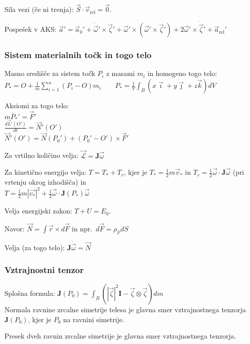 \documentclass[a4paper,10pt]{article}
\theoremstyle{definition}
\newcommand{\vzeta}{\vec{\zeta}}
\newcommand{\dzeta}{\dot{\vzeta}}
\newcommand{\vomega}{\vec{\omega}}
\newcommand{\domega}{\dot{\vomega}}
\newcommand{\va}{\vec{a}}
\newcommand{\Pt}{P_{\ast}}
\begin{document}
Sila vezi (če ni trenja): $\vec{S} \cdot \vec{v}_{\operatorname{rel}} = \vec{0}.$

Pospešek v AKS: $\va' = \va_0' + \domega' \times \vzeta' + \vomega' \times (\vomega' \times \vzeta') + 2 \vomega'\times\dzeta' + \va_{\operatorname{rel}}'$

\subsubsection*{Sistem materialnih točk in togo telo}
Masno središče za sistem točk $P_i$ z masami $m_i$ in homogeno togo telo: \\
$ \displaystyle \Pt = O + \frac1m \sum_{i=1}^n (P_i - O) m_i \qquad \Pt =
\frac1V \int_B (x\vec{\imath} + y\vec{\jmath} + z\vec{k})dV $

Aksiomi za togo telo: \\
$m\ddot{\Pt}' = \vec{F}'$ \\
$\displaystyle \frac{d\vec{L}'(O')}{dt} = \vec{N}'(O')$ \\
$\vec{N}'(O') = \vec{N}(P_0') + (P_0' - O') \times \vec{F}'$

Za vrtilno količino velja: $\vec{\mathscr L} = \mathbf{J} \vec{\omega}$

Za kinetično energijo velja:
$T = T_\ast + T_r$, kjer je $T_\ast = \frac12 m\vec{v}_\ast$ in $T_r = \frac12
\vomega \cdot \mathbf{J} \vomega$  (pri vrtenju okrog izhodišča) in \\ $T =
\frac{1}{2} m |\vec{v_*}|^2 + \frac{1}{2} \vec{\omega} \cdot \mathbf{J}(\Pt)
\vec{\omega}$

Velja energijski zakon: $T + U = E_0$.

Navor: $\vec{N} = \int \vec{r} \times d\vec{F}$ in npr.\ $d\vec{F} = \rho_F dS$

Velja (za togo telo): $\mathbf{J} \domega = \vec{N}$

\subsubsection*{Vztrajnostni tenzor} Splošna formula: $\mathbf{J}(P_0) = \int_B
(|\vec{\zeta}|^2 \mathbf I - \vec{\zeta} \otimes \vec{\zeta} ) dm$\\

Normala ravnine zrcalne simetrije telesa je glavna smer vztrajnostnega tenzorja
$\mathbf{J}(P_0)$, kjer je $P_0$ na ravnini simetrije.

Presek dveh ravnin zrcalne simetrije je glavna smer vztrajnostnega tenzorja.\\
\end{document}
